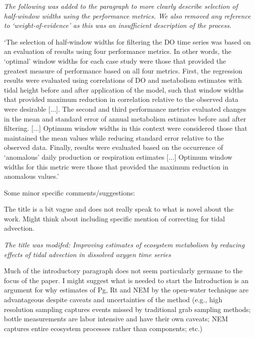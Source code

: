 \documentclass[letterpaper,12pt]{article}\usepackage[]{graphicx}\usepackage[]{color}
\begin{document}
{\it The following was added to the paragraph to more clearly describe selection of half-window widths using the performance metrics.  We also removed any reference to `weight-of-evidence' as this was an insufficient description of the process.

`The selection of half-window widths for filtering the DO time series was based on an evaluation of results using four performance metrics.  In other words, the `optimal' window widths for each case study were those that provided the greatest measure of performance based on all four metrics.  First, the regression results were evaluated using correlations of DO and metabolism estimates with tidal height before and after application of the model, such that window widths that provided maximum reduction in correlation relative to the observed data were desirable [...]. The second and third performance metrics evaluated changes in the mean and standard error of annual metabolism estimates before and after filtering.  [...] Optimum window widths in this context were considered those that maintained the mean values while reducing standard error relative to the observed data. Finally, results were evaluated based on the occurrence of `anomalous' daily production or respiration estimates [...] Optimum window widths for this metric were those that provided the maximum reduction in anomalous values.'
}

Some minor specific comments/suggestions:

The title is a bit vague and does not really speak to what is novel about the work. Might think about including specific mention of correcting for tidal advection.

{\it The title was modifed: Improving estimates of ecosystem metabolism by reducing effects of tidal advection in dissolved oxygen time series}

Much of the introductory paragraph does not seem particularly germane to the focus of the paper. I might suggest what is needed to start the Introduction is an argument for why estimates of Pg, Rt and NEM by the open-water technique are advantageous despite caveats and uncertainties of the method (e.g., high resolution sampling captures events missed by traditional grab sampling methods; bottle measurements are labor intensive and have their own caveats; NEM captures entire ecosystem processes rather than components; etc.)
\end{document}
